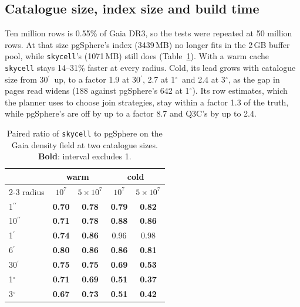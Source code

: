 \documentclass[preprint,12pt]{elsarticle}
\newcommand{\arcsec}{\ensuremath{^{\prime\prime}}}
\newcommand{\arcmin}{\ensuremath{^{\prime}}}
\newcommand{\degr}{\ensuremath{^{\circ}}}
\begin{document}
\subsection{Catalogue size, index size and build time}
\label{sec:scale}
\label{sec:scale-memory}

Ten million rows is 0.55\% of Gaia DR3, so the tests were repeated at 50 million rows.
At that size pgSphere's index (3439\,MB) no longer fits in the 2\,GB buffer pool, while
\texttt{skycell}'s (1071\,MB) still does (Table~\ref{tab:scale}). With a warm cache
\texttt{skycell} stays 14--31\% faster at every radius. Cold, its lead grows with
catalogue size from 30\arcmin\ up, to a factor 1.9 at 30\arcmin, 2.7 at 1\degr\ and 2.4
at 3\degr, as the gap in pages read widens (188 against pgSphere's 642 at 1\degr). Its
row estimates, which the planner uses to choose join strategies, stay within a factor
1.3 of the truth, while pgSphere's are off by up to a factor 8.7 and Q3C's by up to 2.4.

\begin{table}
  \caption{Paired ratio of \texttt{skycell} to pgSphere on the Gaia density field at two
    catalogue sizes. \textbf{Bold}: interval excludes 1.}
  \label{tab:scale}
  \centering
  \footnotesize
  \begin{tabular}{@{}l cc cc@{}}
    \hline\hline
    & \multicolumn{2}{c}{warm} & \multicolumn{2}{c}{cold} \\
    \cline{2-3}\cline{4-5}
    radius & $10^7$ & $5{\times}10^7$ & $10^7$ & $5{\times}10^7$ \\
    \hline
    1\arcsec  & \textbf{0.70} & \textbf{0.78} & \textbf{0.79} & \textbf{0.82} \\
    10\arcsec & \textbf{0.71} & \textbf{0.78} & \textbf{0.88} & \textbf{0.86} \\
    1\arcmin  & \textbf{0.74} & \textbf{0.86} & 0.96          & 0.98          \\
    6\arcmin  & \textbf{0.80} & \textbf{0.86} & \textbf{0.86} & \textbf{0.81} \\
    30\arcmin & \textbf{0.75} & \textbf{0.75} & \textbf{0.69} & \textbf{0.53} \\
    1\degr    & \textbf{0.71} & \textbf{0.69} & \textbf{0.51} & \textbf{0.37} \\
    3\degr    & \textbf{0.67} & \textbf{0.73} & \textbf{0.51} & \textbf{0.42} \\
    \hline
  \end{tabular}
\end{table}
\end{document}
